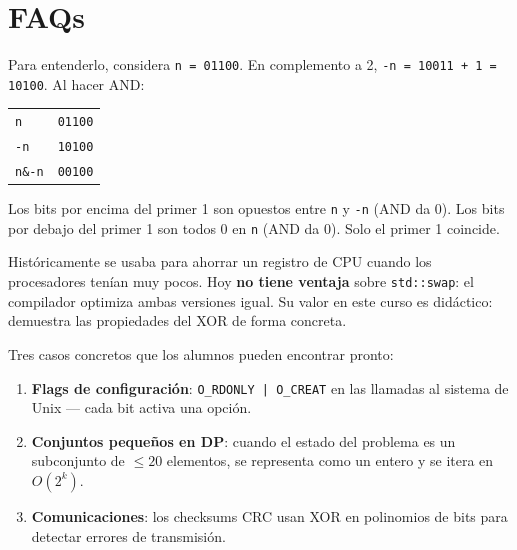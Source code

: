 \documentclass[12pt, oneside]{article}
\begin{document}
\section{FAQs}

\begin{notaprofesor}
  Para entenderlo, considera \texttt{n = 01100}. En complemento a 2,
  \texttt{-n = 10011 + 1 = 10100}. Al hacer AND:
  \begin{center}
  \begin{tabular}{ll}
    \texttt{n}    & \texttt{01100} \\
    \texttt{-n}   & \texttt{10100} \\
    \texttt{n\&-n} & \texttt{00100} \\
  \end{tabular}
  \end{center}
  Los bits por encima del primer 1 son opuestos entre \texttt{n} y
  \texttt{-n} (AND da 0). Los bits por debajo del primer 1 son
  todos 0 en \texttt{n} (AND da 0). Solo el primer 1 coincide. \checkmark
\end{notaprofesor}

\begin{notaprofesor}
  Históricamente se usaba para ahorrar un registro de CPU cuando los
  procesadores tenían muy pocos. Hoy \textbf{no tiene ventaja} sobre
  \texttt{std::swap}: el compilador optimiza ambas versiones igual.
  Su valor en este curso es didáctico: demuestra las propiedades del XOR
  de forma concreta.
\end{notaprofesor}

\begin{notaprofesor}
  Tres casos concretos que los alumnos pueden encontrar pronto:
  \begin{enumerate}
    \item \textbf{Flags de configuración}: \texttt{O\_RDONLY | O\_CREAT}
          en las llamadas al sistema de Unix — cada bit activa una opción.
    \item \textbf{Conjuntos pequeños en DP}: cuando el estado del problema
          es un subconjunto de $\leq 20$ elementos, se representa como un
          entero y se itera en $O(2^k)$.
    \item \textbf{Comunicaciones}: los checksums CRC usan XOR en polinomios
          de bits para detectar errores de transmisión.
  \end{enumerate}
\end{notaprofesor}
\end{document}
